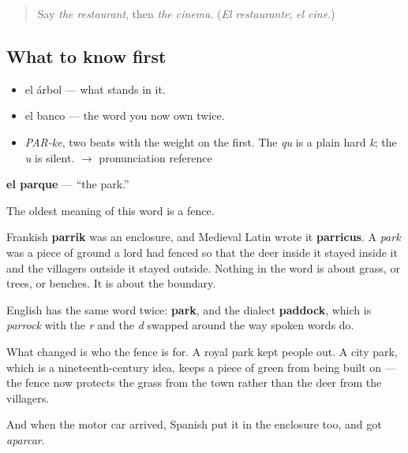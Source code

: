 \label{lesson:ES-C354-parque}



\begin{quote}
Say \emph{the restaurant}, then \emph{the cinema}. (\emph{El restaurante}; \emph{el cine}.)
\end{quote}

\subsection*{What to know first}
\begin{itemize}
\raggedright
  \item el árbol — what stands in it.
  \item el banco — the word you now own twice.
\end{itemize}

\begin{sounds}
\begin{itemize}
\raggedright
  \item \emph{PAR-ke}, two beats with the weight on the first. The \emph{qu} is a plain hard \emph{k}; the \emph{u} is silent. $\to$ pronunciation reference
\end{itemize}
\end{sounds}

\begin{cousinweb}
\textbf{el parque} — \textquotedblleft{}the park.\textquotedblright{}

The oldest meaning of this word is a fence.

Frankish \textbf{parrik} was an enclosure, and Medieval Latin wrote it \textbf{parricus}. A \emph{park} was a piece of ground a lord had fenced so that the deer inside it stayed inside it and the villagers outside it stayed outside. Nothing in the word is about grass, or trees, or benches. It is about the boundary.

English has the same word twice: \textbf{park}, and the dialect \textbf{paddock}, which is \emph{parrock} with the \emph{r} and the \emph{d} swapped around the way spoken words do.

What changed is who the fence is for. A royal park kept people out. A city park, which is a nineteenth-century idea, keeps a piece of green from being built on — the fence now protects the grass from the town rather than the deer from the villagers.

And when the motor car arrived, Spanish put it in the enclosure too, and got \emph{aparcar}.
\end{cousinweb}

